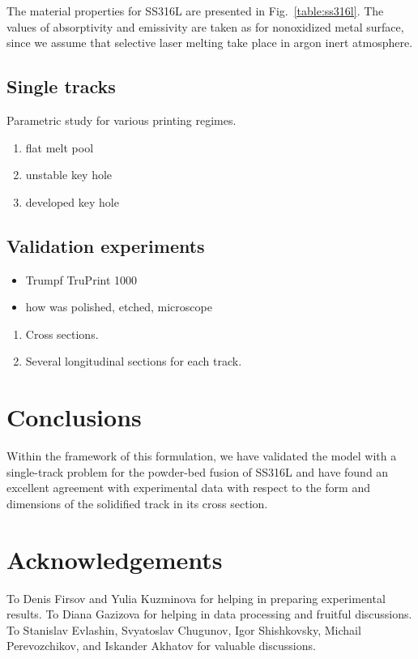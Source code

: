 \documentclass{article}
\begin{document}
The material properties for SS316L are presented in Fig.~\ref{table:ss316l}.
The values of absorptivity and emissivity are taken as for nonoxidized metal surface,
since we assume that selective laser melting take place in argon inert atmosphere.

\subsection{Single tracks}

Parametric study for various printing regimes.
\begin{enumerate}
    \item flat melt pool
    \item unstable key hole
    \item developed key hole
\end{enumerate}

\subsection{Validation experiments}

\begin{itemize}
    \item Trumpf TruPrint 1000
    \item how was polished, etched, microscope
\end{itemize}


\begin{enumerate}
    \item Cross sections.
    \item Several longitudinal sections for each track.
\end{enumerate}

\section{Conclusions}

Within the framework of this formulation, we have validated the model with a single-track problem
for the powder-bed fusion of SS316L and have found an excellent agreement with experimental data
with respect to the form and dimensions of the solidified track in its cross section.

\section{Acknowledgements}
To Denis Firsov and Yulia Kuzminova for helping in preparing experimental results.
To Diana Gazizova for helping in data processing and fruitful discussions.
To Stanislav Evlashin, Svyatoslav Chugunov, Igor Shishkovsky, Michail Perevozchikov, and Iskander Akhatov for valuable discussions.
\end{document}
